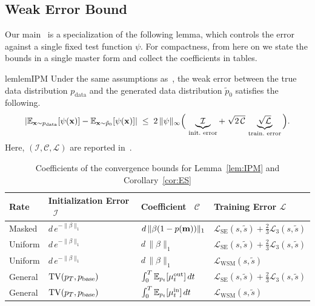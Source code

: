 \documentclass{article} %
\newcommand{\bfx}{{\bf x}}
\newcommand{\bfm}{{\bf m}}
\newcommand{\TV}{\mathrm{TV}}
\newcommand{\LWSM}{\mathcal{L}_{\mathrm{WSM}}}
\newcommand{\LSE}{\mathcal{L}_{\mathrm{SE}}}
\newcommand{\LThree}{\mathcal{L}_{3}}
\begin{document}
\subsection{Weak Error Bound}
Our main~ is a specialization of the following lemma, which controls the error against a single fixed test function $\psi$. For compactness, from here on we state the bounds in a single master form and collect the coefficients in tables.

\begin{restatable}{lem}{lemIPM}\label{lem:IPM}
Under the same assumptions as~, the weak error between the true data distribution $p_{\mathrm{data}}$ and the generated data distribution $\tilde{p}_0$ satisfies the following. \\
\begin{equation}\label{eq:master_specialized}
  \left| \mathbb{E}_{\bfx \sim p_{\mathrm{data}}}[\psi(\bfx)] - \mathbb{E}_{\bfx \sim \tilde{p}_0}[\psi(\bfx)] \right|  \;\le\;2\, \|\psi\|_\infty \Big(\,\underbrace{\mathcal I}_{\text{init.\ error}}
  +\; \sqrt{2\,\mathcal C}\,\underbrace{\sqrt{\mathcal L}}_{\text{train.\ error}}\Big).
\end{equation}
Here, $(\mathcal I,\mathcal C,\mathcal L)$ are reported in~.
\begin{table}[!ht]
\centering
\caption{Coefficients of the convergence bounds for Lemma~\ref{lem:IPM} and Corollary~\ref{cor:ES} \label{tab:coeff}}
\begin{tabular}{llll}
\toprule
Rate & Initialization Error \ $\mathcal I$ & Coefficient \ $\mathcal C$ & Training Error $\mathcal L$ \\
\midrule
Masked  & $d\,e^{-\|\beta\|_1}$ & $d\,\|\beta(1-p(\bfm))\|_1$ & $\LSE(s, \tilde{s})+\tfrac23\LThree(s, \tilde{s})$ \\
Uniform & $d\,e^{-\|\beta\|_1}$ & $d\,\|\beta\|_1$            & $\LSE(s, \tilde{s})+\tfrac23\LThree(s, \tilde{s})$ \\
Uniform & $d\,e^{-\|\beta\|_1}$ & $d\,\|\beta\|_1$            & $\LWSM(s, \tilde{s})$ \\
General & $\TV(p_T,p_{\rm base})$ & $\int_0^T\mathbb E_{p_t}[\mu^{\rm out}_t]\,dt$ & $\LSE(s, \tilde{s})+\tfrac23\LThree(s, \tilde{s})$ \\
General & $\TV(p_T,p_{\rm base})$ & $\int_0^T\mathbb E_{p_t}[\mu^{\rm in}_t]\,dt$  & $\LWSM(s, \tilde{s})$ \\
\bottomrule
\end{tabular}
\end{table}
\end{restatable}
\end{document}
